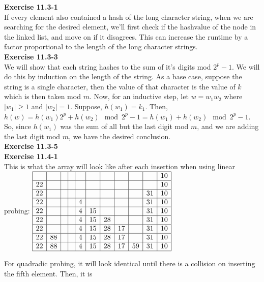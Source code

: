 \documentclass{article}
\begin{document}
\noindent\textbf{ Exercise 11.3-1} \\
If every element also contained a hash of the long character string, when we are searching for the desired element, we'll first check if the hashvalue of the node in the linked list, and move on if it disagrees. This can increase the runtime by a factor proportional to the length of the long character strings.\\


\noindent\textbf{ Exercise 11.3-3} \\
We will show that each string hashes to the sum of it's digits mod $2^p-1$. We will do this by induction on the length of the string. As a base case, suppose the string is a single character, then the value of that character is the value of $k$ which is then taken mod $m$. Now, for an inductive step, let $w = w_1 w_2$ where $|w_1|\ge 1$ and $|w_2|=1$. Suppose, $h(w_1) = k_1$. Then, $h(w) = h(w_1)2^p + h(w_2) \mod 2^p-1 = h(w_1)+h(w_2) \mod 2^p-1$. So, since $h(w_1)$ was the sum of all but the last digit mod $m$, and we are adding the last digit mod $m$, we have the desired conclusion.\\

\noindent\textbf{ Exercise 11.3-5} \\

\noindent\textbf{ Exercise 11.4-1} \\
This is what the array will look like after each insertion when using linear probing:
$
\begin{array}{|c|c|c|c|c|c|c|c|c|c|c|}
\hline
&&&&&&&&&&10\\
\hline
22&&&&&&&&&&10\\
\hline
22&&&&&&&&&31&10\\
\hline
22&&&&4&&&&&31&10\\
\hline
22&&&&4&15&&&&31&10\\
\hline
22&&&&4&15&28&&&31&10\\
\hline
22&&&&4&15&28&17&&31&10\\
\hline
22&88&&&4&15&28&17&&31&10\\
\hline
22&88&&&4&15&28&17&59&31&10\\
\hline
\end{array}
$

For quadradic probing, it will look identical until there is a collision on inserting the fifth element. Then, it is
\end{document}
